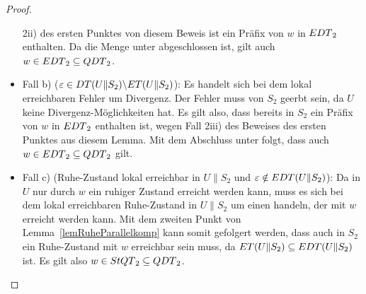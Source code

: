 \begin{proof}
\begin{itemize}
      2ii) des ersten Punktes von diesem Beweis ist ein Präfix von $w$
      in $EDT{}_2$ enthalten. Da die Menge \EDT{} unter \cont{}
      abgeschlossen ist, gilt auch $w\in EDT{}_2 \subseteq QDT{}_2$.
    \item Fall b) ($\varepsilon\in DT{}(U\|S_2)\backslash
      ET{}(U\|S_2)$): Es handelt sich bei dem lokal erreichbaren Fehler um
      Divergenz. Der Fehler muss von $S_2$ geerbt sein, da $U$ keine
      Divergenz-Möglichkeiten hat. Es gilt also, dass bereits in $S_2$ ein
      Präfix von $w$ in $EDT{}_2$ enthalten ist, wegen Fall 2iii) des
      Beweises des ersten Punktes aus diesem Lemma. Mit dem Abschluss unter
      \cont{} folgt, dass auch $w\in EDT{}_2\subseteq QDT{}_2$ gilt.
    \item Fall c) (Ruhe-Zustand lokal erreichbar in $U\|S_2$ und
      $\varepsilon\notin EDT{}(U\|S_2)$): Da in $U$ nur durch $w$ ein
      ruhiger Zustand erreicht werden kann, muss es sich bei dem lokal
      erreichbaren Ruhe-Zustand in $U\|S_2$ um einen handeln, der mit $w$
      erreicht werden kann. Mit dem zweiten Punkt von
      Lemma~\ref{lemRuheParallelkomp} kann somit gefolgert werden, dass auch in
      $S_2$ ein Ruhe-Zustand mit $w$ erreichbar sein muss, da
      $ET{}(U\|S_2)\subseteq EDT{}(U\|S_2)$ ist. Es gilt also $w\in
      StQT{}_2\subseteq QDT{}_2$.
  \end{itemize}


\end{proof}
